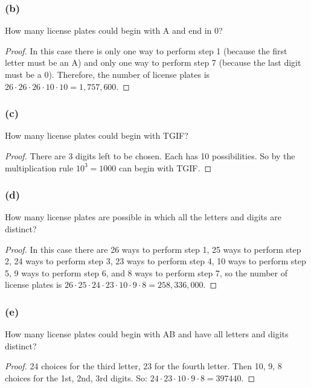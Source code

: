 \documentclass[14pt]{extarticle}
\begin{document}
\subsubsection{(b)}
How many license plates could begin with A and end in 0?
\begin{proof}
     In this case there is only one way to perform step 1 (because the first letter must be an A) and only one way to
     perform step 7 (because the last digit must be a 0). Therefore, the number of license plates is
     \(26 \cdot 26 \cdot 26 \cdot 10 \cdot 10 = 1,757,600\).
\end{proof}

\subsubsection{(c)}
How many license plates could begin with TGIF?

\begin{proof}
     There are 3 digits left to be chosen. Each has 10 possibilities. So by the multiplication rule \(10^3=1000\)
     can begin with TGIF.
\end{proof}

\subsubsection{(d)}
How many license plates are possible in which all the letters and digits are distinct?

\begin{proof}
     In this case there are 26 ways to perform step 1, 25 ways to perform step 2, 24 ways to perform step 3, 23 ways to
     perform step 4, 10 ways to perform step 5, 9 ways to perform step 6, and 8 ways to perform step 7, so the number
     of license plates is \(26 \cdot 25 \cdot 24 \cdot 23 \cdot 10 \cdot 9 \cdot 8 = 258,336,000\).
\end{proof}

\subsubsection{(e)}
How many license plates could begin with AB and have all letters and digits distinct?

\begin{proof}
     24 choices for the third letter, 23 for the fourth letter. Then 10, 9, 8 choices for the 1st, 2nd, 3rd digits. So:
     \(24 \cdot 23 \cdot 10 \cdot 9 \cdot 8 = 397440\).
\end{proof}
\end{document}
